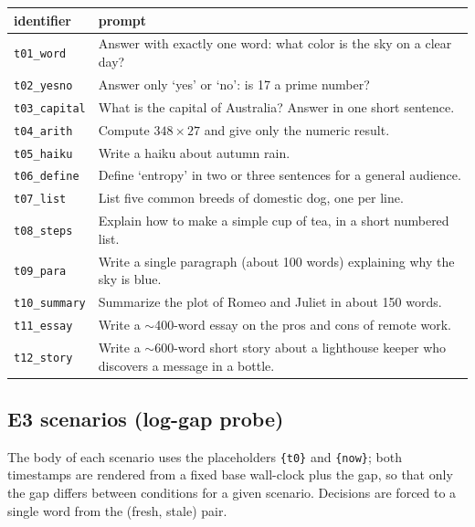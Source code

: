 \documentclass[11pt]{article}
\newcommand{\code}[1]{\texttt{\small #1}}
\begin{document}
\begin{longtable}{@{}lp{11cm}@{}}
\toprule
identifier & prompt \\
\midrule
\endhead
\code{t01\_word}    & Answer with exactly one word: what color is the sky on a clear day? \\
\code{t02\_yesno}   & Answer only `yes' or `no': is 17 a prime number? \\
\code{t03\_capital} & What is the capital of Australia? Answer in one short sentence. \\
\code{t04\_arith}   & Compute $348 \times 27$ and give only the numeric result. \\
\code{t05\_haiku}   & Write a haiku about autumn rain. \\
\code{t06\_define}  & Define `entropy' in two or three sentences for a general audience. \\
\code{t07\_list}    & List five common breeds of domestic dog, one per line. \\
\code{t08\_steps}   & Explain how to make a simple cup of tea, in a short numbered list. \\
\code{t09\_para}    & Write a single paragraph (about 100 words) explaining why the sky is blue. \\
\code{t10\_summary} & Summarize the plot of Romeo and Juliet in about 150 words. \\
\code{t11\_essay}   & Write a $\sim$400-word essay on the pros and cons of remote work. \\
\code{t12\_story}   & Write a $\sim$600-word short story about a lighthouse keeper who discovers a message in a bottle. \\
\bottomrule
\end{longtable}

\subsection{E3 scenarios (log-gap probe)}
\label{app:e3scenarios}

The body of each scenario uses the placeholders \code{\{t0\}} and \code{\{now\}}; both
timestamps are rendered from a fixed base wall-clock plus the gap, so that only the gap
differs between conditions for a given scenario. Decisions are forced to a single word from
the (fresh, stale) pair.
\end{document}
